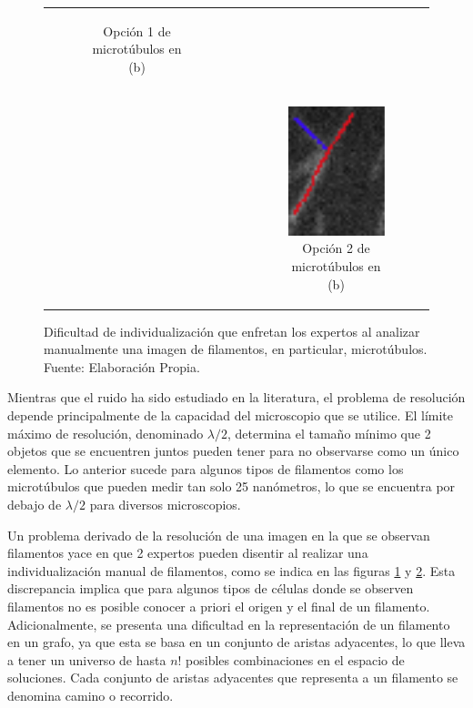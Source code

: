 \begin{figure}[h]
\begin{tabular}{c c c}
\begin{subfigure}[t]{0.21\textwidth}
        \caption{Opci\'on 1 de microt\'ubulos en (b)} %
        \label{fig:NoConsensoOpcion1}
        \end{subfigure} \\
        & &
        \begin{subfigure}[b]{0.21\textwidth}
        \includegraphics[scale=0.8]{imagenes/NoConsenso4.png}
        \caption{Opci\'on 2 de microt\'ubulos en (b)}
        \label{fig:NoConsensoOpcion2}
        \end{subfigure} \\
    \end{tabular}
    
    \caption[Dificultad de individualizaci\'on que enfretan los expertos al analizar manualmente una imagen de filamentos.]{Dificultad de individualizaci\'on que enfretan los expertos al analizar manualmente una imagen de filamentos, en particular, microt\'ubulos. Fuente: Elaboraci\'on Propia.}
    \label{fig:NoConsenso}
\end{figure}

Mientras que el ruido ha sido estudiado en la literatura, el problema de resoluci\'on depende principalmente de la capacidad del microscopio que se utilice. El l\'imite m\'aximo de resoluci\'on, denominado $\lambda/2$, determina el tama\~no m\'inimo que 2 objetos que se encuentren juntos pueden tener para no observarse como un \'unico elemento. Lo anterior sucede para algunos tipos de filamentos como los microt\'ubulos que pueden medir tan solo 25 nan\'ometros, lo que se encuentra por debajo de $\lambda/2$ para diversos microscopios.


Un problema derivado de la resoluci\'on de una imagen en la que se observan filamentos yace en que 2 expertos pueden disentir al realizar una individualizaci\'on manual de filamentos, como se indica en las figuras \ref{fig:NoConsensoOpcion1} y \ref{fig:NoConsensoOpcion2}. Esta discrepancia implica que para algunos tipos de c\'elulas donde se observen filamentos no es posible conocer a priori el origen y el final de un filamento. Adicionalmente, se presenta una dificultad en la representaci\'on de un filamento en un grafo, ya que esta se basa en un conjunto de aristas adyacentes, lo que lleva a tener un universo de hasta $n!$ posibles combinaciones en el espacio de soluciones. Cada conjunto de aristas adyacentes que representa a un filamento se denomina camino o recorrido.


